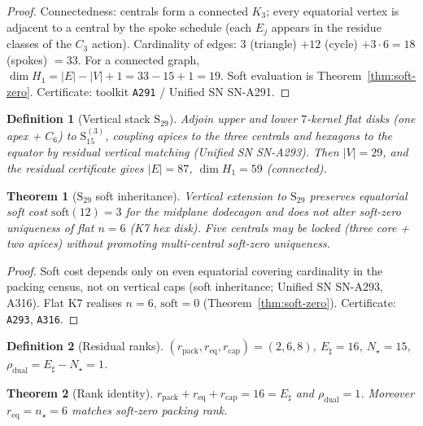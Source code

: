 \documentclass[11pt,a4paper]{article}
\newtheorem{theorem}{Theorem}
\newtheorem{definition}{Definition}
\theoremstyle{remark}
\begin{document}
\begin{proof}
Connectedness: centrals form a connected $K_3$; every equatorial vertex is adjacent to a central by the spoke schedule (each $E_j$ appears in the residue classes of the $C_3$ action). Cardinality of edges: $3$ (triangle) $+12$ (cycle) $+3\cdot 6=18$ (spokes) $=33$. For a connected graph, $\dim H_1=|E|-|V|+1=33-15+1=19$. Soft evaluation is Theorem~\ref{thm:soft-zero}. Certificate: toolkit \texttt{A291} / Unified SN SN-A291.
\end{proof}

\begin{definition}[Vertical stack $\mathrm{S}_{29}$]
\label{def:S29}
Adjoin upper and lower $7$-kernel flat disks (one apex + $C_6$) to $\mathrm{S}_{15}^{(3)}$, coupling apices to the three centrals and hexagons to the equator by residual vertical matching (Unified SN SN-A293). Then $|V|=29$, and the residual certificate gives $|E|=87$, $\dim H_1=59$ (connected).
\end{definition}

\begin{theorem}[$\mathrm{S}_{29}$ soft inheritance]
\label{thm:S29}
Vertical extension to $\mathrm{S}_{29}$ preserves equatorial soft cost $\mathrm{soft}(12)=3$ for the midplane dodecagon and does not alter soft-zero uniqueness of flat $n=6$ (K7 hex disk). Five centrals may be locked (three core + two apices) without promoting multi-central soft-zero uniqueness.
\end{theorem}

\begin{proof}
Soft cost depends only on even equatorial covering cardinality in the packing census, not on vertical caps (soft inheritance; Unified SN SN-A293, A316). Flat K7 realises $n=6$, $\mathrm{soft}=0$ (Theorem~\ref{thm:soft-zero}). Certificate: \texttt{A293}, \texttt{A316}.
\end{proof}

\begin{definition}[Residual ranks]
\label{def:ranks}
$(r_{\mathrm{pack}},r_{\mathrm{eq}},r_{\mathrm{cap}})=(2,6,8)$, $E_\sharp=16$, $N_\star=15$, $\rho_{\mathrm{dual}}=E_\sharp-N_\star=1$.
\end{definition}

\begin{theorem}[Rank identity]
\label{thm:ranks}
$r_{\mathrm{pack}}+r_{\mathrm{eq}}+r_{\mathrm{cap}}=16=E_\sharp$ and $\rho_{\mathrm{dual}}=1$. Moreover $r_{\mathrm{eq}}=n_\star=6$ matches soft-zero packing rank.
\end{theorem}
\end{document}
